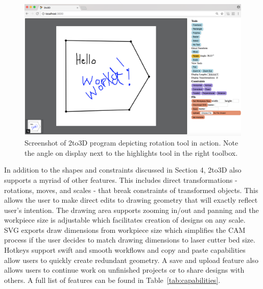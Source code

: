 \begin{figure}[H]
  \includegraphics[width=\linewidth]{screenshot2.png}
  \caption{Screenshot of 2to3D program depicting rotation tool in action. Note the angle on display next to the highlights tool in the right toolbox.}
  \label{fig:screenshot2}
\end{figure}

In addition to the shapes and constraints discussed in Section 4, 2to3D also supports a myriad of other features. This includes direct transformations - rotations, moves, and scales - that break constraints of transformed objects. This allows the user to make direct edits to drawing geometry that will exactly reflect user's intention. The drawing area supports zooming in/out and panning and the workpiece size is adjustable which facilitates creation of designs on any scale. SVG exports draw dimensions from workpiece size which simplifies the CAM process if the user decides to match drawing dimensions to laser cutter bed size. Hotkeys support swift and smooth workflows and copy and paste capabilities allow users to quickly create redundant geometry. A save and upload feature also allows users to continue work on unfinished projects or to share designs with others. A full list of features can be found in Table~\ref{tab:capabilities}.

